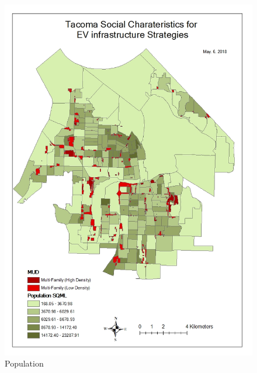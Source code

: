 \documentclass[]{article}
\begin{document}
\begin{figure}
\centering
\includegraphics{./figs/pop.jpg}
\caption{Population}
\end{figure}
\end{document}
